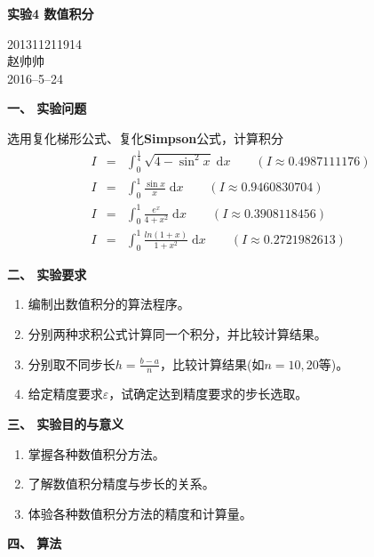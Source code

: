 \documentclass[a4paper,11pt]{article}
\begin{document}
\begin{center}
	\huge{\textbf{实验4 数值积分\\}}
\end{center}
\begin{flushright}
	201311211914\\
	赵帅帅\\
	2016--5--24\\
\end{flushright}
\begin{Large}
	\textbf{一、 实验问题}
\end{Large}

	选用复化梯形公式、复化\textbf{Simpson}公式，计算积分
	\begin{eqnarray}
		I & = & \int_{0}^{\frac{1}{4}}\sqrt{4-\sin^{2}{x}}\;\mathrm{d}x\qquad(I\approx{}0.4987111176)\nonumber\\
		I & = & \int_{0}^{1}\frac{\sin{x}}{x}\;\mathrm{d}x\qquad(I\approx{}0.9460830704)\nonumber\\
		I & = & \int_{0}^{1}\frac{e^{x}}{4+x^2}\;\mathrm{d}x\qquad(I\approx{}0.3908118456)\nonumber\\
		I & = & \int_{0}^{1}\frac{ln(1+x)}{1+x^2}\;\mathrm{d}x\qquad(I\approx{}0.2721982613)\nonumber
	\end{eqnarray}
\begin{Large}
	\textbf{二、 实验要求}
\end{Large}
\begin{enumerate}
	\item 编制出数值积分的算法程序。
	\item 分别两种求积公式计算同一个积分，并比较计算结果。
	\item 分别取不同步长$h=\frac{b-a}{n}$，比较计算结果(如$n=10,20$等)。
	\item 给定精度要求$\varepsilon$，试确定达到精度要求的步长选取。
\end{enumerate}
\begin{Large}
	\textbf{三、 实验目的与意义}
\end{Large}
\begin{enumerate}
	\item 掌握各种数值积分方法。
	\item 了解数值积分精度与步长的关系。
	\item 体验各种数值积分方法的精度和计算量。
\end{enumerate}
\begin{Large}
	\textbf{四、 算法}
\end{Large}
\end{document}

